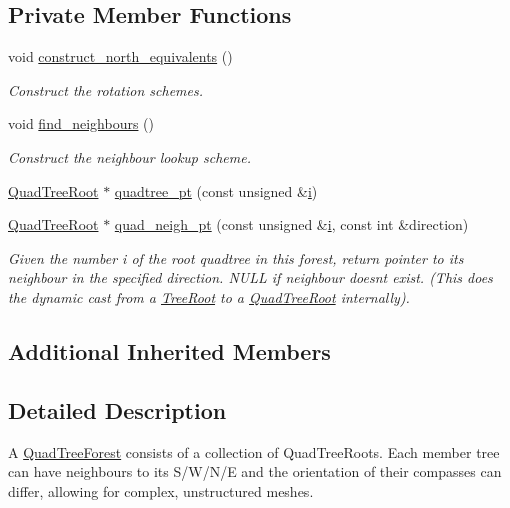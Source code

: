 \subsection*{Private Member Functions}
\begin{DoxyCompactItemize}
\item 
void \hyperlink{classoomph_1_1QuadTreeForest_aa425f1cf4268764e5ab3e4144a70a973}{construct\+\_\+north\+\_\+equivalents} ()
\begin{DoxyCompactList}\small\item\em Construct the rotation schemes. \end{DoxyCompactList}\item 
void \hyperlink{classoomph_1_1QuadTreeForest_a835592b97a235b8dd31ea54d440b02c9}{find\+\_\+neighbours} ()
\begin{DoxyCompactList}\small\item\em Construct the neighbour lookup scheme. \end{DoxyCompactList}\item 
\hyperlink{classoomph_1_1QuadTreeRoot}{Quad\+Tree\+Root} $\ast$ \hyperlink{classoomph_1_1QuadTreeForest_a2bca62b0121338eb8c7c159df8c23f19}{quadtree\+\_\+pt} (const unsigned \&\hyperlink{cfortran_8h_adb50e893b86b3e55e751a42eab3cba82}{i})
\item 
\hyperlink{classoomph_1_1QuadTreeRoot}{Quad\+Tree\+Root} $\ast$ \hyperlink{classoomph_1_1QuadTreeForest_a4437bebe3b3920619199b9abd3958049}{quad\+\_\+neigh\+\_\+pt} (const unsigned \&\hyperlink{cfortran_8h_adb50e893b86b3e55e751a42eab3cba82}{i}, const int \&direction)
\begin{DoxyCompactList}\small\item\em Given the number i of the root quadtree in this forest, return pointer to its neighbour in the specified direction. N\+U\+LL if neighbour doesn\textquotesingle{}t exist. (This does the dynamic cast from a \hyperlink{classoomph_1_1TreeRoot}{Tree\+Root} to a \hyperlink{classoomph_1_1QuadTreeRoot}{Quad\+Tree\+Root} internally). \end{DoxyCompactList}\end{DoxyCompactItemize}
\subsection*{Additional Inherited Members}


\subsection{Detailed Description}
A \hyperlink{classoomph_1_1QuadTreeForest}{Quad\+Tree\+Forest} consists of a collection of Quad\+Tree\+Roots. Each member tree can have neighbours to its S/\+W/\+N/E and the orientation of their compasses can differ, allowing for complex, unstructured meshes. 

